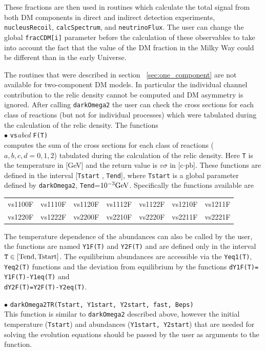 \documentclass[12pt,a4paper]{article}
\begin{document}
These fractions are   
  then used in routines which calculate the total signal from both  DM components  in direct and indirect detection experiments,
 \verb|nucleusRecoil|, \verb|calcSpectrum|,  and \verb|neutrinoFlux|.  The user can change the global {\tt  fracCDM[i]} parameter before the calculation of these observables
to take into account the fact that the value of the DM fraction in the Milky Way could be different than   in the early Universe.

The routines that were described in section ~\ref{sec:one_component} are not available for two-component DM models. In particular the individual channel contribution to the relic density cannot be computed and DM asymmetry is ignored. 
 After calling  {\tt  darkOmega2}  the user can check the  cross sections  
for each class of reactions (but not for individual processes) which were tabulated during the calculation of the relic density. 
The functions\\
$\bullet$ \verb|vs|{\it abcd} \verb|F(T)|\\
computes the sum of  the cross sections  
for each class of reactions ($a,b,c,d=0,1,2$) tabulated during the calculation of the relic density. 
Here  \verb|T| is the temperature in [GeV] and the 
return value is $v\sigma$ in [c$\cdot$pb].  These functions are defined in the interval [{\tt Tstart} , {\tt Tend}], where
{\tt Tstart} is a global parameter defined by \verb|darkOmega2|, {\tt Tend}=$10^{-3}{\rm GeV}$. Specifically the functions available are

\begin{center}
\begin{tabular}{ l l l l l l l }
vs1100F & vs1110F & vs1120F&vs1112F&vs1122F&vs1210F&vs1211F\\
vs1220F&vs1222F&vs2200F&vs2210F&vs2220F&vs2211F& vs2221F
\end{tabular}
\end{center} 

The  temperature dependence  of the abundances can also be called by the user, the functions are named {\tt Y1F(T)} and {\tt Y2F(T)} and are defined only in the  interval ${\tt T}\in
[\rm{Tend},\rm{Tstart}]$. The equilibrium abundances are accessible via  the  { \tt Yeq1(T)}, { \tt Yeq2(T)} functions and the deviation from equilibrium  
by the functions
 {\tt dY1F(T)= Y1F(T)-Y1eq(T)}  and \\
   { \tt dY2F(T)=Y2F(T)-Y2eq(T)}.

\noindent
$\bullet$ \verb|darkOmega2TR(Tstart, Y1start, Y2start, fast, Beps)|\\
This function is similar to \verb|darkOmega2| described above, however the initial temperature (\verb|Tstart|) and abundances (\verb|Y1start, Y2start|) that are needed for solving the evolution equations should be  passed by the user as arguments to the function. 
\end{document}

